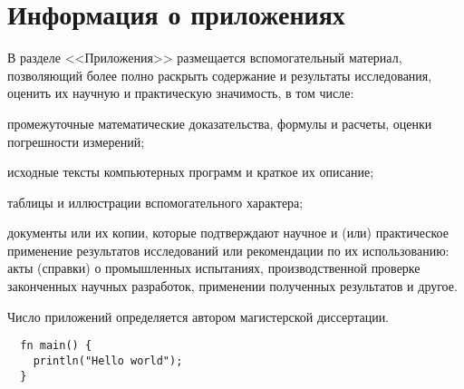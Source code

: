         

    

\appendix
\chapter{Информация о приложениях}
В разделе <<Приложения>> размещается вспомогательный материал, позволяющий более полно раскрыть содержание и результаты исследования, оценить их научную и практическую значимость, в том числе:

промежуточные математические доказательства, формулы и расчеты, оценки погрешности измерений;

исходные тексты компьютерных программ и краткое их описание;

таблицы и иллюстрации вспомогательного характера;

документы или их копии, которые подтверждают научное и (или) практическое применение результатов исследований или рекомендации по их использованию: акты (справки) о промышленных испытаниях, производственной проверке законченных научных разработок, применении полученных результатов и другое.

Число приложений определяется автором магистерской диссертации.

\begin{verbatim}
  fn main() {
    println("Hello world");
  }
\end{verbatim}